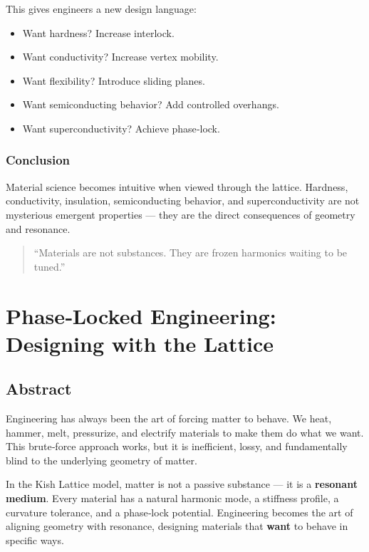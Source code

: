 \documentclass[11pt, letterpaper, openany]{book}
\begin{document}
This gives engineers a new design language:

\begin{itemize}
    \item Want hardness? Increase interlock.
    \item Want conductivity? Increase vertex mobility.
    \item Want flexibility? Introduce sliding planes.
    \item Want semiconducting behavior? Add controlled overhangs.
    \item Want superconductivity? Achieve phase‑lock.
\end{itemize}

\subsection*{Conclusion}

Material science becomes intuitive when viewed through the lattice. Hardness, conductivity,
insulation, semiconducting behavior, and superconductivity are not mysterious emergent
properties — they are the direct consequences of geometry and resonance.

\begin{quote}
“Materials are not substances. They are frozen harmonics waiting to be tuned.”
\end{quote}

\chapter{Phase‑Locked Engineering: Designing with the Lattice}

\section{Abstract}

Engineering has always been the art of forcing matter to behave. We heat, hammer, melt,
pressurize, and electrify materials to make them do what we want. This brute‑force
approach works, but it is inefficient, lossy, and fundamentally blind to the underlying
geometry of matter.

In the Kish Lattice model, matter is not a passive substance — it is a \textbf{resonant
medium}. Every material has a natural harmonic mode, a stiffness profile, a curvature
tolerance, and a phase‑lock potential. Engineering becomes the art of aligning geometry
with resonance, designing materials that \textbf{want} to behave in specific ways.
\end{document}
